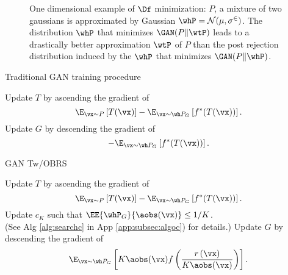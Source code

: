 \documentclass[twoside]{article}
\begin{document}
\begin{figure}[t]
\vspace{10pt}
\caption{One dimensional example of $\Df$ minimization: $P$, a mixture of two gaussians is approximated by Gaussian  $\whP=\cal N(\mu, \sigma^2)$. The distribution $\whP$ that minimizes $\GAN(P\Vert\wtP)$ leads to a drastically better approximation $\wtP$ of $P$ than the post rejection distribution induced by the $\whP$ that minimizes $\GAN(P\Vert\whP)$.  }
    \label{fig:1DoptimalG}
\end{figure}


\begin{algorithm}[H]
\caption{Traditional GAN training procedure}
\label{alg:naiveapproach}
\begin{small}
\begin{algorithmic}\Repeat
\State Update $T$ by ascending the gradient of $$
  \E_{\vx\sim P}\left[T(\vx) \right] - \E_{\vx\sim \wh P_G}\left[ f^*(T(\vx))\right].$$
  \State Update $G$ by descending the gradient of $$
   - \E_{\vx\sim \wh P_G}\left[ f^*(T(\vx))\right].$$
\end{algorithmic}

\end{small}
\end{algorithm}

\begin{algorithm}[b!]
\caption{GAN Tw/OBRS}
\label{alg:TOBRS}
\begin{small}    
\begin{algorithmic} \Repeat
\State Update $T$ by ascending the gradient of $$\E_{\vx\sim P}\left[T(\vx) \right] - \E_{\vx\sim \wh P_G}\left[ f^*(T(\vx))\right].$$
  \State Update $c_K$ such that $\EE{\whP_G}{\aobs(\vx)} \leq 1/K$. \\
  \hspace{2cm}(See Alg \ref{alg:searchc} in App \ref{app:subsec:algoc}) for details.)
  \State Update $G$ by descending the gradient of $$
   \E_{\vx\sim \wh P_G}\left[K\aobs(\vx) f\left(\frac{r\left(\vx\right)}{K\aobs(\vx)}\right)\right].$$
\end{algorithmic}
\end{small}
\end{algorithm}
\end{document}
